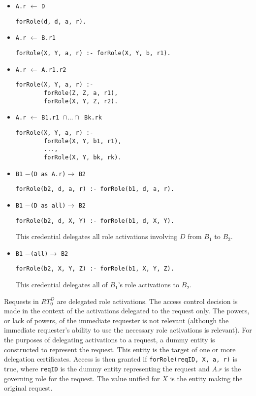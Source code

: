 \documentclass{article}
\newcommand{\memcert}[2]{\texttt{#1} $\leftarrow$ \texttt{#2}}
\newcommand{\delcert}[3]{\texttt{#1} $-$\texttt{(#2)}$\rightarrow$ \texttt{#3}}
\begin{document}
\begin{itemize}

\item \memcert{A.r}{D}

\texttt{forRole(d, d, a, r).}

\item \memcert{A.r}{B.r1}

\texttt{forRole(X, Y, a, r) :- forRole(X, Y, b, r1).}

\item \memcert{A.r}{A.r1.r2}
\begin{verbatim}
forRole(X, Y, a, r) :-
        forRole(Z, Z, a, r1),
        forRole(X, Y, Z, r2).
\end{verbatim}

\item \memcert{A.r}{B1.r1 $\cap \ldots \cap$ Bk.rk}
\begin{verbatim}
forRole(X, Y, a, r) :-
        forRole(X, Y, b1, r1),
        ...,
        forRole(X, Y, bk, rk).
\end{verbatim}

\item \delcert{B1}{D as A.r}{B2}

\texttt{forRole(b2, d, a, r) :- forRole(b1, d, a, r).}

\item \delcert{B1}{D as all}{B2}

\texttt{forRole(b2, d, X, Y) :- forRole(b1, d, X, Y).}

This credential delegates all role activations involving $D$ from $B_1$ to $B_2$.

\item \delcert{B1}{all}{B2}

\texttt{forRole(b2, X, Y, Z) :- forRole(b1, X, Y, Z).}

This credential delegates all of $B_1$'s role activations to $B_2$.

\end{itemize}

Requests in $RT_0^D$ are delegated role activations. The access control decision is made in the
context of the activations delegated to the request only. The powers, or lack of powers, of the
immediate requester is not relevant (although the immediate requester's ability to use the
necessary role activations is relevant). For the purposes of delegating activations to a
request, a dummy entity is constructed to represent the request. This entity is the target of
one or more delegation certificates. Access is then granted if \texttt{forRole(reqID, X, a, r)}
is true, where \texttt{reqID} is the dummy entity representing the request and $A.r$ is the
governing role for the request. The value unified for $X$ is the entity making the original
request.
\end{document}
